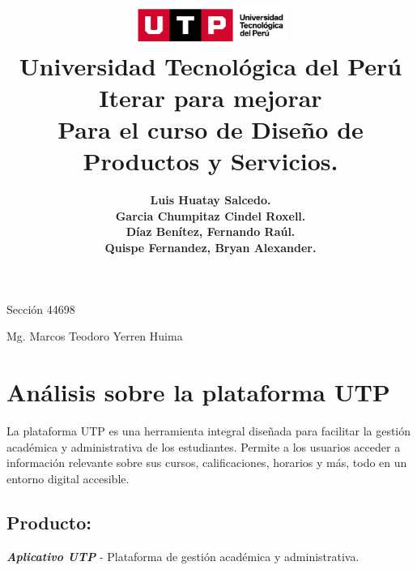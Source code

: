 \documentclass{article}
\title{
  \includegraphics[width=5cm]{./assets/logo-utp.png} \\
  \vspace{1cm}
  \textbf{Universidad Tecnológica del Perú} \\
  \vspace{2cm}
  \textbf{Iterar para mejorar} \\
  \vspace{1cm}
  \large \textbf{Para el curso de Diseño de Productos y Servicios.}
}
\author{
  \textbf{Luis Huatay Salcedo.} \\
  \textbf{Garcia Chumpitaz Cindel Roxell.} \\
  \textbf{Díaz Benítez, Fernando Raúl.} \\
  \textbf{Quispe Fernandez, Bryan Alexander.}
}
\begin{document}
\maketitle
\begin{center}
  Sección 44698
\end{center}
\thispagestyle{empty}
\begin{center}
  Mg. Marcos Teodoro Yerren Huima  
\end{center}
\restoregeometry




\newpage


\section{Análisis sobre la plataforma UTP}

La plataforma UTP es una herramienta integral diseñada para facilitar la gestión académica y administrativa de los estudiantes. Permite a los usuarios acceder a información relevante sobre sus cursos, calificaciones, horarios y más, todo en un entorno digital accesible.

\subsection*{Producto:}
\textit{\textbf{Aplicativo UTP}} - Plataforma de gestión académica y administrativa.
\end{document}
